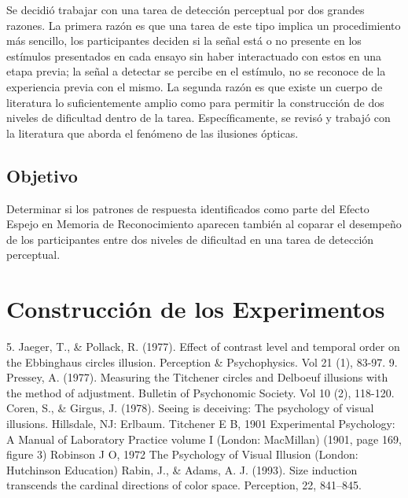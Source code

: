 Se decidió trabajar con una tarea de detección perceptual por dos grandes razones. La primera razón es que una tarea de este tipo implica un procedimiento más sencillo, los participantes deciden si la señal está o no presente en los estímulos presentados en cada ensayo sin haber interactuado con estos en una etapa previa; la señal a detectar se percibe en el estímulo, no se reconoce de la experiencia previa con el mismo. La segunda razón es que existe un cuerpo de literatura lo suficientemente amplio como para permitir la construcción de dos niveles de dificultad dentro de la tarea. Específicamente, se revisó y trabajó con la literatura que aborda el fenómeno de las ilusiones ópticas.\\

\subsection{Objetivo}

Determinar si los patrones de respuesta identificados como parte del Efecto Espejo en Memoria de Reconocimiento aparecen también al coparar el desempeño de los participantes entre dos niveles de dificultad en una tarea de detección perceptual.\\

\section{Construcción de los Experimentos}

5.	Jaeger, T., & Pollack, R. (1977). Effect of contrast level and temporal order on the Ebbinghaus circles illusion. Perception & Psychophysics. Vol 21 (1), 83-97.
9.	Pressey, A. (1977). Measuring the Titchener circles and Delboeuf illusions with the method of adjustment. Bulletin of Psychonomic Society. Vol 10 (2), 118-120.
Coren, S., & Girgus, J. (1978). Seeing is deceiving: The psychology of visual illusions. Hillsdale, NJ: Erlbaum.
Titchener E B, 1901 Experimental Psychology: A Manual of Laboratory Practice volume I (London: MacMillan) (1901, page 169, figure 3)
Robinson J O, 1972 The Psychology of Visual Illusion (London: Hutchinson Education)
Rabin, J., & Adams, A. J. (1993). Size induction transcends the cardinal directions of color space. Perception, 22, 841–845.

